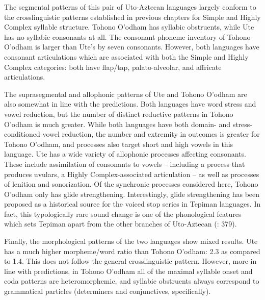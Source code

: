   The segmental patterns of this pair of Uto-Aztecan languages largely conform to the crosslinguistic patterns established in previous chapters for Simple and Highly Complex syllable structure. Tohono O’odham has syllabic obstruents, while Ute has no syllabic consonants at all. The consonant phoneme inventory of Tohono O’odham is larger than Ute’s by seven consonants. However, both languages have consonant articulations which are associated with both the Simple and Highly Complex categories: both have flap/tap, palato-alveolar, and affricate articulations.

  The suprasegmental and allophonic patterns of Ute and Tohono O’odham are also somewhat in line with the predictions. Both languages have word stress and vowel reduction, but the number of distinct reductive patterns in Tohono O’odham is much greater. While both languages have both domain- and stress-conditioned vowel reduction, the number and extremity in outcomes is greater for Tohono O’odham, and processes also target short and high vowels in this language. Ute has a wide variety of allophonic processes affecting consonants. These include assimilation of consonants to vowels -- including a process that produces uvulars, a Highly Complex-associated articulation -- as well as processes of lenition and sonorization. Of the synchronic processes considered here, Tohono O’odham only has glide strengthening. Interestingly, glide strengthening has been proposed as a historical source for the voiced stop series in Tepiman languages. In fact, this typologically rare sound change is one of the phonological features which sets Tepiman apart from the other branches of Uto-Aztecan (\citealt{ShaulHill1998}: 379).

  Finally, the morphological patterns of the two languages show mixed results. Ute has a much higher morpheme/word ratio than Tohono O’odham: 2.3 as compared to 1.4. This does not follow the general crosslinguistic pattern. However, more in line with predictions, in Tohono O’odham all of the maximal syllable onset and coda patterns are heteromorphemic, and syllabic obstruents always correspond to grammatical particles (determiners and conjunctives, specifically).

